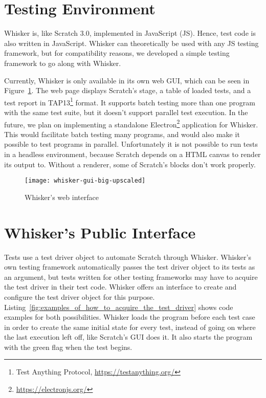 \section{Testing Environment}
\label{sec:testing_environment}

Whisker is, like Scratch 3.0, implemented in JavaScript (JS).
Hence, test code is also written in JavaScript.
Whisker can theoretically be used with any JS testing framework,
but for compatibility reasons, we developed a simple testing framework to go along with Whisker.
\parspace

Currently, Whisker is only available in its own web GUI, which can be seen in Figure~\ref{fig:whisker_gui}.
The web page displays Scratch's stage, a table of loaded tests, and a test report in TAP13\footnote{Test Anything Protocol, \url{https://testanything.org/}} format.
It supports batch testing more than one program with the same test suite,
but it doesn't support parallel test execution.
In the future, we plan on implementing a standalone Electron\footnote{\url{https://electronjs.org/}} application for Whisker.
This would facilitate batch testing many programs,
and would also make it possible to test programs in parallel.
Unfortunately it is not possible to run tests in a headless environment,
because Scratch depends on a HTML canvas to render its output to.
Without a renderer, some of Scratch's blocks don't work properly.

\begin{figure}[htpb]
    \centering
    \texttt{[image: whisker-gui-big-upscaled]}
    \caption{Whisker's web interface}
    \label{fig:whisker_gui}
\end{figure}

\section{Whisker's Public Interface}
\label{sec:public_interface}

Tests use a test driver object to automate Scratch through Whisker.
Whisker's own testing framework automatically passes the test driver object to its tests as an argument,
but tests written for other testing frameworks may have to acquire the test driver in their test code.
Whisker offers an interface to create and configure the test driver object for this purpose.
Listing~\ref{fig:examples_of_how_to_acquire_the_test_driver} shows code examples for both possibilities.
Whisker loads the program before each test case in order to create the same initial state for every test,
instead of going on where the last execution left off, like Scratch's GUI does it.
It also starts the program with the green flag when the test begins.

